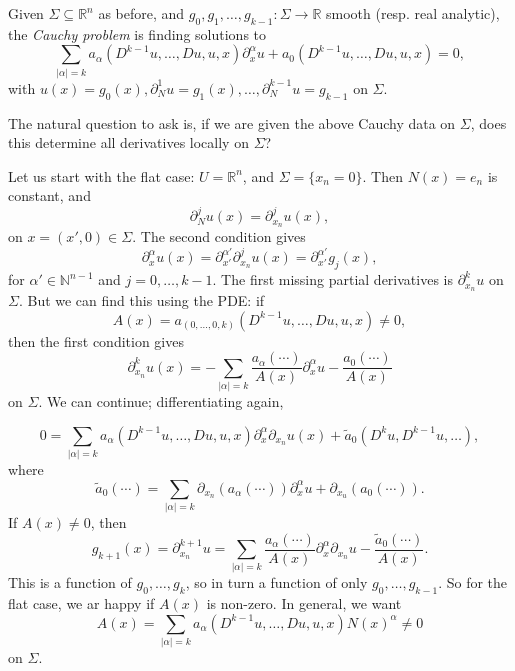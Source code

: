\documentclass[12pt]{article}
\begin{document}
\begin{definition}
	Given $\Sigma \subseteq  \mathbb{R}^n$ as before, and $g_0, g_1, \ldots, g_{k-1} : \Sigma \to \mathbb{R}$ smooth (resp. real analytic), the \emph{Cauchy problem} is finding solutions to
	\[
	\sum_{|\alpha| = k} a_\alpha (D^{k-1} u, \ldots, Du, u, x) \partial^\alpha_x u + a_0(D^{k-1}u, \ldots, Du, u, x) = 0,
	\]
	with $u(x) = g_0(x), \partial^1_N u = g_1(x), \ldots, \partial^{k-1}_N u = g_{k-1}$ on $\Sigma$.
\end{definition}

The natural question to ask is, if we are given the above Cauchy data on $\Sigma$, does this determine all derivatives locally on $\Sigma$?

Let us start with the flat case: $U = \mathbb{R}^n$, and $\Sigma = \{x_n = 0\}$. Then $N(x) = e_n$ is constant, and
\[
\partial^j_N u(x) = \partial^j_{x_n} u(x),
\]
on $x = (x', 0) \in \Sigma$. The second condition gives
\[
\partial^{\alpha}_x u(x) = \partial^{\alpha'}_{x'} \partial^j_{x_n} u(x) = \partial^{\alpha'}_{x'} g_j(x),
\]
for $\alpha' \in \mathbb{N}^{n-1}$ and $j = 0, \ldots, k-1$. The first missing partial derivatives is $\partial^{k}_{x_n} u$ on $\Sigma$. But we can find this using the PDE: if
\[
A(x) = a_{(0, \ldots, 0, k)}(D^{k-1}u, \ldots, Du, u, x) \neq 0,
\]
then the first condition gives
\[
\partial^k_{x_n} u(x) = - \sum_{|\alpha| = k} \frac{a_\alpha(\cdots)}{A(x)} \partial^\alpha_x u - \frac{a_0(\cdots)}{A(x)}
\]
on $\Sigma$. We can continue; differentiating again,

\[
0 = \sum_{|\alpha| = k} a_\alpha(D^{k-1} u, \ldots, Du, u, x) \partial^\alpha_x \partial_{x_n} u(x) + \tilde a_0 (D^k u, D^{k-1} u, \ldots),
\]
where
\[
\tilde a_0 (\cdots) = \sum_{|\alpha| = k} \partial_{x_n} (a_\alpha(\cdots)) \partial^\alpha_x u + \partial_{x_u}(a_0(\cdots)).
\]
If $A(x) \neq 0$, then
\[
g_{k+1}(x) = \partial^{k+1}_{x_n} u = \sum_{|\alpha| = k} \frac{a_\alpha(\cdots)}{A(x)} \partial^\alpha_x \partial_{x_n} u - \frac{\tilde a_0(\cdots)}{A(x)}.
\]
This is a function of $g_0, \ldots, g_k$, so in turn a function of only $g_0, \ldots, g_{k-1}$. So for the flat case, we ar happy if $A(x)$ is non-zero. In general, we want
\[
A(x) = \sum_{|\alpha| = k} a_\alpha (D^{k-1} u, \ldots, Du, u, x) N(x)^\alpha \neq 0
\]
on $\Sigma$.
\end{document}
